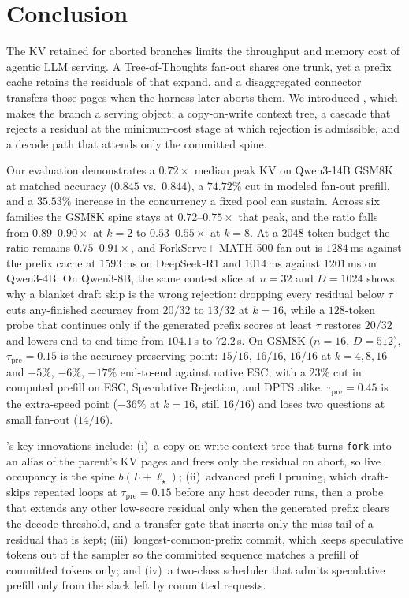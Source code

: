 \section{Conclusion}
\label{sec:conclusion}

The KV retained for aborted branches limits the throughput and memory cost of agentic LLM serving.
A Tree-of-Thoughts fan-out shares one trunk, yet a prefix cache retains the residuals of that expand, and a disaggregated connector transfers those pages when the harness later aborts them.
We introduced \sys, which makes the branch a serving object: a copy-on-write context tree, a cascade that rejects a residual at the minimum-cost stage at which rejection is admissible, and a decode path that attends only the committed spine.

Our evaluation demonstrates a $0.72\times$ median peak KV on Qwen3-14B GSM8K at matched accuracy ($0.845$ vs.\ $0.844$), a $74.72\%$ cut in modeled fan-out prefill, and a $35.53\%$ increase in the concurrency a fixed pool can sustain.
Across six families the GSM8K spine stays at $0.72$--$0.75\times$ that peak, and the ratio falls from $0.89$--$0.90\times$ at $k{=}2$ to $0.53$--$0.55\times$ at $k{=}8$.
At a $2048$-token budget the ratio remains $0.75$--$0.91\times$, and ForkServe+ MATH-500 fan-out is $1284$\,ms against the prefix cache at $1593$\,ms on DeepSeek-R1 and $1014$\,ms against $1201$\,ms on Qwen3-4B.
On Qwen3-8B, the same contest slice at $n{=}32$ and $D{=}1024$ shows why a blanket draft skip is the wrong rejection: dropping every residual below $\tau$ cuts any-finished accuracy from $20/32$ to $13/32$ at $k{=}16$, while a $128$-token probe that continues only if the generated prefix scores at least $\tau$ restores $20/32$ and lowers end-to-end time from $104.1$\,s to $72.2$\,s.
On GSM8K ($n{=}16$, $D{=}512$), $\tau_{\mathrm{pre}}{=}0.15$ is the accuracy-preserving point: $15/16$, $16/16$, $16/16$ at $k{=}4,8,16$ and $-5\%$, $-6\%$, $-17\%$ end-to-end against native ESC, with a $23\%$ cut in computed prefill on ESC, Speculative Rejection, and DPTS alike.
$\tau_{\mathrm{pre}}{=}0.45$ is the extra-speed point ($-36\%$ at $k{=}16$, still $16/16$) and loses two questions at small fan-out ($14/16$).

\sys's key innovations include: (i)~a copy-on-write context tree that turns \texttt{fork} into an alias of the parent's KV pages and frees only the residual on abort, so live occupancy is the spine $b(L+\ell_\star)$; (ii)~advanced prefill pruning, which draft-skips repeated loops at $\tau_{\mathrm{pre}}{=}0.15$ before any host decoder runs, then a probe that extends any other low-score residual only when the generated prefix clears the decode threshold, and a transfer gate that inserts only the miss tail of a residual that is kept; (iii)~longest-common-prefix commit, which keeps speculative tokens out of the sampler so the committed sequence matches a prefill of committed tokens only; and (iv)~a two-class scheduler that admits speculative prefill only from the slack left by committed requests.

